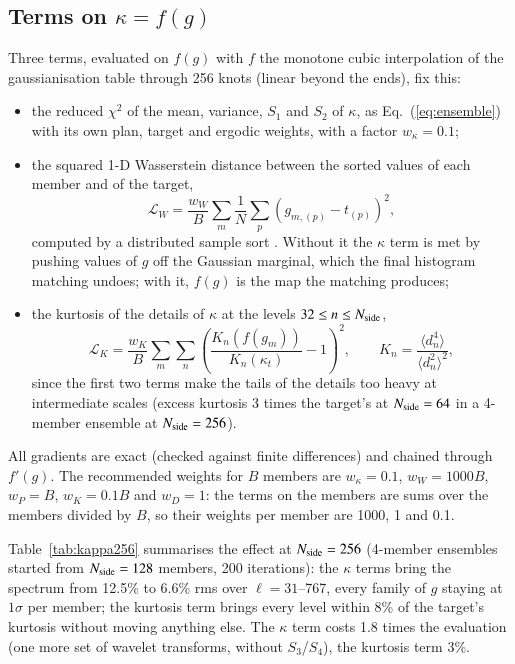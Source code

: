 \documentclass{aa}
\newcommand{\nside}{N_{\rm side}}
\begin{document}
\subsection{Terms on $\kappa=f(g)$}

Three terms, evaluated on $f(g)$ with $f$ the monotone cubic interpolation \citep{fritsch1980} of the gaussianisation table through 256 knots (linear beyond the ends), fix this:
\begin{itemize}
\item the reduced $\chi^2$ of the mean, variance, $S_1$ and $S_2$ of $\kappa$, as Eq.~(\ref{eq:ensemble}) with its own plan, target and ergodic weights, with a factor $w_\kappa=0.1$;
\item the squared 1-D Wasserstein distance \citep{villani2009} between the sorted values of each member and of the target,
\begin{equation}
\mathcal{L}_W = \frac{w_W}{B}\sum_m \frac{1}{N}\sum_p \left(g_{m,(p)} - t_{(p)}\right)^2,
\label{eq:marginal}
\end{equation}
computed by a distributed sample sort \citep{frazer1970}. Without it the $\kappa$ term is met by pushing values of $g$ off the Gaussian marginal, which the final histogram matching undoes; with it, $f(g)$ is the map the matching produces;
\item the kurtosis of the details of $\kappa$ at the levels $32\le n\le\nside$,
\begin{equation}
\mathcal{L}_K = \frac{w_K}{B}\sum_m\sum_n\left(\frac{K_n(f(g_m))}{K_n(\kappa_t)}-1\right)^2, \qquad K_n = \frac{\langle d_n^4\rangle}{\langle d_n^2\rangle^2},
\end{equation}
since the first two terms make the tails of the details too heavy at intermediate scales (excess kurtosis 3 times the target's at $\nside=64$ in a 4-member ensemble at $\nside=256$).
\end{itemize}
All gradients are exact (checked against finite differences) and chained through $f'(g)$. The recommended weights for $B$ members are $w_\kappa = 0.1$, $w_W = 1000B$, $w_P = B$, $w_K = 0.1B$ and $w_D=1$: the terms on the members are sums over the members divided by $B$, so their weights per member are 1000, 1 and 0.1.

Table~\ref{tab:kappa256} summarises the effect at $\nside=256$ (4-member ensembles started from $\nside=128$ members, 200 iterations): the $\kappa$ terms bring the spectrum from 12.5\% to 6.6\% rms over $\ell=31$--767, every family of $g$ staying at $1\sigma$ per member; the kurtosis term brings every level within 8\% of the target's kurtosis without moving anything else. The $\kappa$ term costs 1.8 times the evaluation (one more set of wavelet transforms, without $S_3$/$S_4$), the kurtosis term 3\%.
\end{document}
